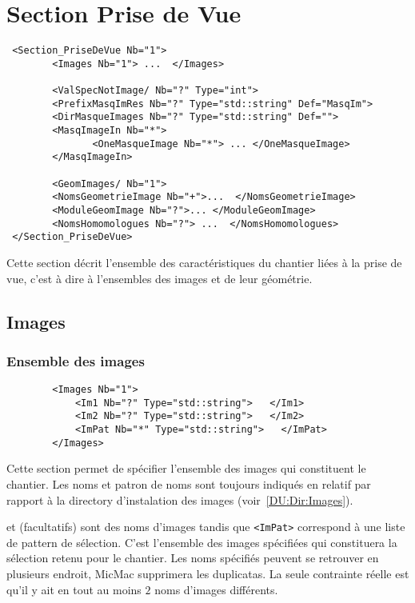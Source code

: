 \section{Section Prise de Vue}

\begin{verbatim}
 <Section_PriseDeVue Nb="1">
        <Images Nb="1"> ...  </Images>

        <ValSpecNotImage/ Nb="?" Type="int">
        <PrefixMasqImRes Nb="?" Type="std::string" Def="MasqIm">  
        <DirMasqueImages Nb="?" Type="std::string" Def=""> 
        <MasqImageIn Nb="*">
               <OneMasqueImage Nb="*"> ... </OneMasqueImage>
        </MasqImageIn>

        <GeomImages/ Nb="1">
        <NomsGeometrieImage Nb="+">...  </NomsGeometrieImage>
        <ModuleGeomImage Nb="?">... </ModuleGeomImage>
        <NomsHomomologues Nb="?"> ...  </NomsHomomologues>
 </Section_PriseDeVue>
\end{verbatim}

Cette section d\'ecrit l'ensemble des caract\'eristiques du chantier
li\'ees \`a la prise de vue, c'est \`a dire \`a l'ensembles des images et
de leur g\'eom\'etrie.

\label{UTIL:AUTRES:PDV:GI}

\subsection{Images}
\subsubsection{Ensemble des images}

\begin{verbatim}
        <Images Nb="1">
            <Im1 Nb="?" Type="std::string">   </Im1>     
            <Im2 Nb="?" Type="std::string">   </Im2>
            <ImPat Nb="*" Type="std::string">   </ImPat>
        </Images>
\end{verbatim}

Cette section permet de sp\'ecifier l'ensemble des images qui
constituent le chantier. Les noms et patron de noms sont toujours
indiqu\'es en relatif par rapport \`a la directory  d'instalation
des images (voir~\ref{DU:Dir:Images}).


{\tt <Im1>} et {\tt <Im2>} (facultatifs) sont des noms d'images tandis que {\tt <ImPat>}
correspond \`a une liste de pattern de s\'election.  C'est l'ensemble
des images sp\'ecifi\'ees qui constituera la s\'election retenu pour
le chantier.  Les noms sp\'ecifi\'es peuvent	 se retrouver en plusieurs endroit,
MicMac supprimera les duplicatas. La seule contrainte r\'eelle est qu'il
y ait en tout au moins $2$ noms d'images diff\'erents.

